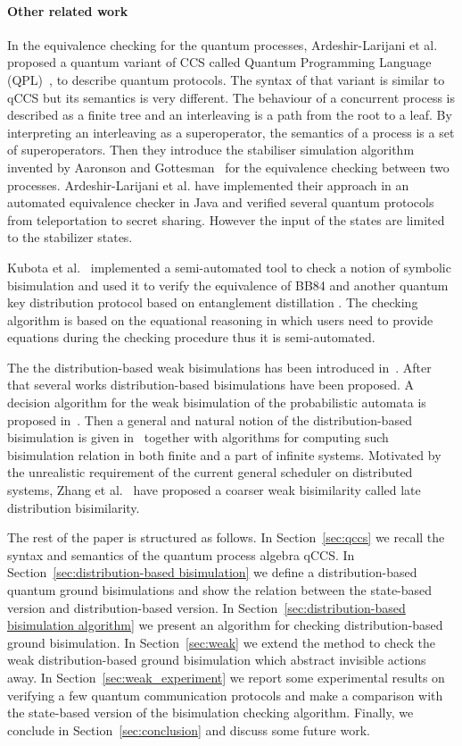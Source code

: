 \documentclass[runningheads]{llncs}
\begin{document}
\paragraph{Other related work} In the equivalence checking for the quantum processes, Ardeshir-Larijani et al.~\cite{AL18} proposed a quantum variant of CCS called Quantum Programming Language (QPL)~\cite{Sel04}, to describe quantum protocols. The syntax of that variant is similar to qCCS but its semantics is very different. The behaviour of a concurrent process is described as a finite tree and an interleaving is a path from the root to a leaf. By interpreting an interleaving as a superoperator, the semantics of a process is a set of superoperators. Then they introduce the stabiliser simulation algorithm invented by Aaronson and Gottesman~\cite{AG04} for the equivalence checking between two processes.
Ardeshir-Larijani et al. have implemented their approach in an automated equivalence checker in Java and verified several quantum protocols from teleportation to secret sharing. However the input of the states are limited to the stabilizer states.

Kubota et al.~\cite{KKKKS16} implemented a semi-automated tool to check a notion of symbolic bisimulation and used it to verify the equivalence of BB84 and another quantum key distribution protocol based on entanglement distillation \cite{SP00}. The checking algorithm is based on the equational reasoning in which users need to provide equations during the checking procedure thus it is semi-automated.

The the distribution-based weak bisimulations has been introduced in~\cite{ehz}. After that several works distribution-based bisimulations have been proposed. A decision algorithm for the weak bisimulation of the probabilistic automata is proposed in~\cite{EHKT13}. Then a general and natural notion of the distribution-based bisimulation is given in~\cite{HKK14} together with algorithms for computing such bisimulation relation in both finite and a part of infinite systems. Motivated by the unrealistic requirement of the current general scheduler on distributed systems, Zhang et al.~\cite{ZYSHEJG18} have proposed a coarser weak bisimilarity called late distribution bisimilarity.

The rest of the paper is structured as follows.
In Section~\ref{sec:qccs} we recall the syntax and semantics of the quantum process algebra qCCS. In Section~\ref{sec:distribution-based bisimulation} we define a distribution-based quantum ground bisimulations and show the relation between the state-based version and distribution-based version. In Section~\ref{sec:distribution-based bisimulation algorithm}  we present an algorithm for checking distribution-based ground bisimulation. In Section~\ref{sec:weak} we extend the method to check the weak distribution-based ground bisimulation which abstract invisible actions away. In Section~\ref{sec:weak_experiment} we report some experimental results on verifying a few quantum communication protocols and make a comparison with the state-based version of the bisimulation checking algorithm. Finally, we conclude in Section~\ref{sec:conclusion} and discuss some future work.
\end{document}
